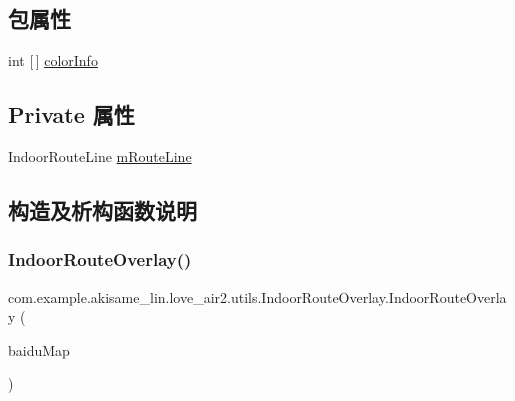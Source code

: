 \subsection*{包属性}
\begin{DoxyCompactItemize}
\item 
int \mbox{[}$\,$\mbox{]} \mbox{\hyperlink{classcom_1_1example_1_1akisame__lin_1_1love__air2_1_1utils_1_1_indoor_route_overlay_a5771133132a2e65544a6ae1da406a4c7}{color\+Info}}
\end{DoxyCompactItemize}
\subsection*{Private 属性}
\begin{DoxyCompactItemize}
\item 
Indoor\+Route\+Line \mbox{\hyperlink{classcom_1_1example_1_1akisame__lin_1_1love__air2_1_1utils_1_1_indoor_route_overlay_a127b0c09c8969cd00b0d9b2d5846a017}{m\+Route\+Line}}
\end{DoxyCompactItemize}


\subsection{构造及析构函数说明}
\mbox{\label{classcom_1_1example_1_1akisame__lin_1_1love__air2_1_1utils_1_1_indoor_route_overlay_ada557137af5ae891109e0b37489eae1e}} 
\subsubsection{\texorpdfstring{IndoorRouteOverlay()}{IndoorRouteOverlay()}}
{\footnotesize\ttfamily com.\+example.\+akisame\+\_\+lin.\+love\+\_\+air2.\+utils.\+Indoor\+Route\+Overlay.\+Indoor\+Route\+Overlay (\begin{DoxyParamCaption}\item[{Baidu\+Map}]{baidu\+Map }\end{DoxyParamCaption})\hspace{0.3cm}{\ttfamily [inline]}}

